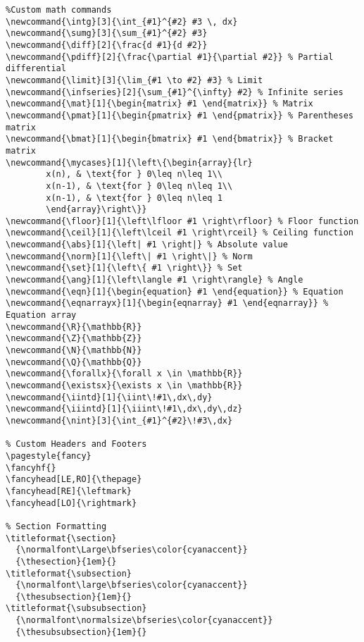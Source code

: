 \documentclass[openany]{book}
\begin{document}
\begin{longlisting}
\begin{verbatim}
%Custom math commands
\newcommand{\intg}[3]{\int_{#1}^{#2} #3 \, dx}
\newcommand{\sumg}[3]{\sum_{#1}^{#2} #3}
\newcommand{\diff}[2]{\frac{d #1}{d #2}}
\newcommand{\pdiff}[2]{\frac{\partial #1}{\partial #2}} % Partial differential
\newcommand{\limit}[3]{\lim_{#1 \to #2} #3} % Limit
\newcommand{\infseries}[2]{\sum_{#1}^{\infty} #2} % Infinite series
\newcommand{\mat}[1]{\begin{matrix} #1 \end{matrix}} % Matrix
\newcommand{\pmat}[1]{\begin{pmatrix} #1 \end{pmatrix}} % Parentheses matrix
\newcommand{\bmat}[1]{\begin{bmatrix} #1 \end{bmatrix}} % Bracket matrix
\newcommand{\mycases}[1]{\left\{\begin{array}{lr}
        x(n), & \text{for } 0\leq n\leq 1\\
        x(n-1), & \text{for } 0\leq n\leq 1\\
        x(n-1), & \text{for } 0\leq n\leq 1
        \end{array}\right\}}
\newcommand{\floor}[1]{\left\lfloor #1 \right\rfloor} % Floor function
\newcommand{\ceil}[1]{\left\lceil #1 \right\rceil} % Ceiling function
\newcommand{\abs}[1]{\left| #1 \right|} % Absolute value
\newcommand{\norm}[1]{\left\| #1 \right\|} % Norm
\newcommand{\set}[1]{\left\{ #1 \right\}} % Set
\newcommand{\ang}[1]{\left\langle #1 \right\rangle} % Angle
\newcommand{\eqn}[1]{\begin{equation} #1 \end{equation}} % Equation
\newcommand{\eqnarrayx}[1]{\begin{eqnarray} #1 \end{eqnarray}} % Equation array
\newcommand{\R}{\mathbb{R}}
\newcommand{\Z}{\mathbb{Z}}
\newcommand{\N}{\mathbb{N}}
\newcommand{\Q}{\mathbb{Q}}
\newcommand{\forallx}{\forall x \in \mathbb{R}}
\newcommand{\existsx}{\exists x \in \mathbb{R}}
\newcommand{\iintd}[1]{\iint\!#1\,dx\,dy}
\newcommand{\iiintd}[1]{\iiint\!#1\,dx\,dy\,dz}
\newcommand{\nint}[3]{\int_{#1}^{#2}\!#3\,dx}

% Custom Headers and Footers
\pagestyle{fancy}
\fancyhf{}
\fancyhead[LE,RO]{\thepage}
\fancyhead[RE]{\leftmark}
\fancyhead[LO]{\rightmark}

% Section Formatting
\titleformat{\section}
  {\normalfont\Large\bfseries\color{cyanaccent}}
  {\thesection}{1em}{}
\titleformat{\subsection}
  {\normalfont\large\bfseries\color{cyanaccent}}
  {\thesubsection}{1em}{}
\titleformat{\subsubsection}
  {\normalfont\normalsize\bfseries\color{cyanaccent}}
  {\thesubsubsection}{1em}{}


\end{verbatim}
\end{longlisting}
\end{document}
